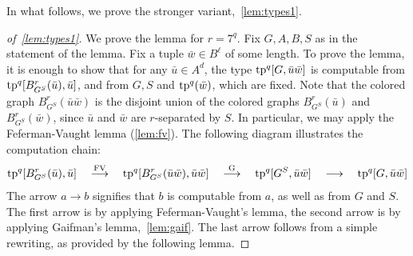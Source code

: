 In what follows, we prove the stronger variant,~\cref{lem:types1}.




\begin{proof}[of~\cref{lem:types1}]
We prove the lemma for $r=7^q$. 
Fix $G,A,B,S$  as in the statement of the lemma.
Fix a tuple $\bar w\in B^\ell$ of some length.
To prove the lemma, it is enough to show that
for any   $\bar u\in A^d$,
the type
$\mathrm{tp}^q[G,\bar u\bar w]$ is computable from $\mathrm{tp}^q[B^r_{G^S}(\bar u), \bar u]$,
and from 
$G,S$ and $\mathrm{tp}^q(\bar w)$, which are fixed.
Note that the colored graph $B^r_{G^S}(\bar u\bar w)$
is the disjoint union of the colored graphs 
$B^r_{G^S}(\bar u)$ and $B^r_{G^S}(\bar w)$,
since $\bar u$ and $\bar w$ are $r$-separated by $S$.
In particular, we may apply the Feferman-Vaught lemma (\cref{lem:fv}).
The following diagram illustrates the computation chain:
\begin{align*}
	\mathrm{tp}^q[B^r_{G^S}(\bar u), \bar u]
  \quad\stackrel{\textrm{FV}}{\longrightarrow}\quad
	\mathrm{tp}^q[B^r_{G^S}(\bar u\bar w), \bar u\bar w] \quad\stackrel{\textrm{G}}\longrightarrow\quad
	\mathrm{tp}^q[G^S, \bar u\bar w] \quad\longrightarrow\quad
	\mathrm{tp}^q[G, \bar u\bar w]
\end{align*}
The arrow $a\longrightarrow b$ signifies that $b$ is computable from $a$, as well as from $G$ and $S$.
The first arrow is by applying Feferman-Vaught's lemma, the second arrow is by applying Gaifman's lemma,~\cref{lem:gaif}.
The last arrow follows from a simple rewriting, as provided by the following lemma.


\end{proof}
